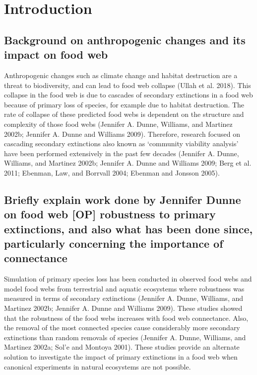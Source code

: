 \documentclass{article}
\begin{document}

\hypertarget{introduction}{%
\section{Introduction}\label{introduction}}

\hypertarget{background-on-anthropogenic-changes-and-its-impact-on-food-web}{%
\subsection{Background on anthropogenic changes and its impact on food
web}\label{background-on-anthropogenic-changes-and-its-impact-on-food-web}}

Anthropogenic changes such as climate change and habitat destruction are
a threat to biodiversity, and can lead to food web collapse (Ullah et
al. 2018). This collapse in the food web is due to cascades of secondary
extinctions in a food web because of primary loss of species, for
example due to habitat destruction. The rate of collapse of these
predicted food webs is dependent on the structure and complexity of
those food webs (Jennifer A. Dunne, Williams, and Martinez 2002b;
Jennifer A. Dunne and Williams 2009). Therefore, research focused on
cascading secondary extinctions also known as `community viability
analysis' have been performed extensively in the past few decades
(Jennifer A. Dunne, Williams, and Martinez 2002b; Jennifer A. Dunne and
Williams 2009; Berg et al. 2011; Ebenman, Law, and Borrvall 2004;
Ebenman and Jonsson 2005).

\hypertarget{briefly-explain-work-done-by-jennifer-dunne-on-food-web-op-robustness-to-primary-extinctions-and-also-what-has-been-done-since-particularly-concerning-the-importance-of-connectance}{%
\subsection{Briefly explain work done by Jennifer Dunne on food web
{[}OP{]} robustness to primary extinctions, and also what has been done
since, particularly concerning the importance of
connectance}\label{briefly-explain-work-done-by-jennifer-dunne-on-food-web-op-robustness-to-primary-extinctions-and-also-what-has-been-done-since-particularly-concerning-the-importance-of-connectance}}

Simulation of primary species loss has been conducted in observed food
webs and model food webs from terrestrial and aquatic ecosystems where
robustness was measured in terms of secondary extinctions (Jennifer A.
Dunne, Williams, and Martinez 2002b; Jennifer A. Dunne and Williams
2009). These studies showed that the robustness of the food webs
increases with food web connectance. Also, the removal of the most
connected species cause considerably more secondary extinctions than
random removals of species (Jennifer A. Dunne, Williams, and Martinez
2002a; Sol'e and Montoya 2001). These studies provide an alternate
solution to investigate the impact of primary extinctions in a food web
when canonical experiments in natural ecosystems are not possible.
\end{document}
